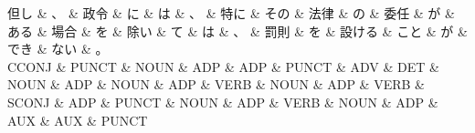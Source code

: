 \documentclass[tikz,border=5pt]{standalone}
\begin{document}
\normalsize
\begin{dependency}[edge unit distance=11.9pt]
    \begin{deptext}[column sep=1em]
        但し \& 、 \& 政令 \& に \& は \& 、 \& 特に \& その \& 法律 \& の \& 委任 \& が \& ある \& 場合 \& を \& 除い \& て \& は \& 、 \& 罰則 \& を \& 設ける \& こと \& が \& でき \& ない \& 。\\
        CCONJ \& PUNCT \& NOUN \& ADP \& ADP \& PUNCT \& ADV \& DET \& NOUN \& ADP \& NOUN \& ADP \& VERB \& NOUN \& ADP \& VERB \& SCONJ \& ADP \& PUNCT \& NOUN \& ADP \& VERB \& NOUN \& ADP \& AUX \& AUX \& PUNCT\\
    \end{deptext}
\end{dependency}
\end{document}
